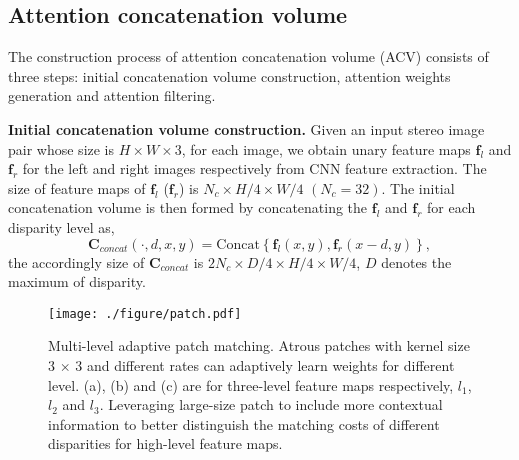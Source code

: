 \documentclass[10pt,twocolumn,letterpaper]{article}
\begin{document}
\subsection{Attention concatenation volume} \label{sec:acv}
The construction process of attention concatenation volume (ACV) consists of three steps: initial concatenation volume construction, attention weights generation and attention filtering.

\textbf{Initial concatenation volume construction.} Given an input stereo image pair whose  size is $H{\times}W{\times}3$, for each image, we obtain unary feature maps $\mathbf{f}_l$ and $\mathbf{f}_r$ for the left and right images respectively from CNN feature extraction. The size of feature maps of $\mathbf{f}_l$ ($\mathbf{f}_r$) is $N_c{\times}H/4{\times}W/4$ $(N_c=32)$. The initial concatenation volume is then formed by concatenating the $\mathbf{f}_l$ and $\mathbf{f}_r$ for each disparity level as,
\begin{equation}
\mathbf{C}_{concat}(\cdot,d,x,y)=\text{Concat}\left\{\mathbf{f}_{l}(x,y),\mathbf{f}_{r}(x-d,y)\right\},
\end{equation}
the accordingly size of $\mathbf{C}_{concat}$ is $2N_c\times{D}/4\times{H}/4\times{W}/4$, $D$ denotes the maximum of disparity.

\begin{figure}
\centering
{\texttt{[image: ./figure/patch.pdf]}}
\caption{
Multi-level adaptive patch matching. Atrous patches with kernel size 3 $\times$ 3 and different rates can adaptively learn weights for different level. (a), (b) and (c) are for three-level feature maps respectively, $l_1$, $l_2$ and $l_3$. Leveraging large-size patch to include  more  contextual  information  to  better  distinguish the matching costs of different disparities for high-level feature maps.}\label{fig:patch}
\vspace{-10pt}
\end{figure}
\end{document}
